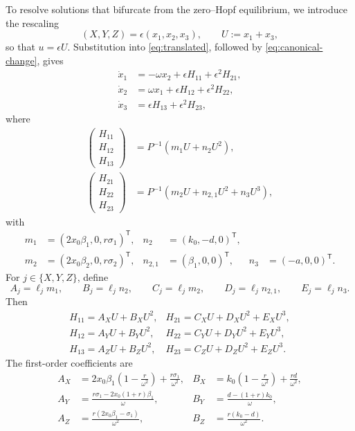\documentclass[11pt]{amsart}
\theoremstyle{remark}
\begin{document}
To resolve solutions that bifurcate from the zero--Hopf equilibrium, we
introduce the rescaling
\[
 (X,Y,Z)=\epsilon(x_1,x_2,x_3),\qquad U:=x_1+x_3,
\]
so that \(u=\epsilon U\).  Substitution into \eqref{eq:translated}, followed
by \eqref{eq:canonical-change}, gives
\begin{equation}\label{eq:blowup}
\begin{aligned}
\dot{x}_1&=-\omega x_2+\epsilon H_{11}+\epsilon^2H_{21},\\
\dot{x}_2&=\omega x_1+\epsilon H_{12}+\epsilon^2H_{22},\\
\dot{x}_3&=\epsilon H_{13}+\epsilon^2H_{23},
\end{aligned}
\end{equation}
where
\begin{equation}\label{eq:H-definitions}
\begin{aligned}
\begin{pmatrix}H_{11}\\H_{12}\\H_{13}\end{pmatrix}
&=P^{-1}(m_1U+n_2U^2),\\
\begin{pmatrix}H_{21}\\H_{22}\\H_{23}\end{pmatrix}
&=P^{-1}(m_2U+n_{2,1}U^2+n_3U^3),
\end{aligned}
\end{equation}
with
\[
\begin{aligned}
m_1&=(2x_0\beta_1,0,r\sigma_1)^{\mathsf T},
& n_2&=(k_0,-d,0)^{\mathsf T},\\
m_2&=(2x_0\beta_2,0,r\sigma_2)^{\mathsf T},
& n_{2,1}&=(\beta_1,0,0)^{\mathsf T},
& n_3&=(-a,0,0)^{\mathsf T}.
\end{aligned}
\]
For \(j\in\{X,Y,Z\}\), define
\[
 A_j=\ell_jm_1,\qquad B_j=\ell_jn_2,\qquad
 C_j=\ell_jm_2,\qquad D_j=\ell_jn_{2,1},\qquad E_j=\ell_jn_3.
\]
Then
\begin{equation}\label{eq:H-coefficients}
\begin{array}{lll}
H_{11}=A_XU+B_XU^2,&
H_{21}=C_XU+D_XU^2+E_XU^3,\\
H_{12}=A_YU+B_YU^2,&
H_{22}=C_YU+D_YU^2+E_YU^3,\\
H_{13}=A_ZU+B_ZU^2,&
H_{23}=C_ZU+D_ZU^2+E_ZU^3.
\end{array}
\end{equation}
The first-order coefficients are
\begin{equation}\label{eq:first-order-coefficients}
\begin{aligned}
A_X&=2x_0\beta_1\left(1-\frac r{\omega^2}\right)
     +\frac{r\sigma_1}{\omega^2},
&
B_X&=k_0\left(1-\frac r{\omega^2}\right)+\frac{rd}{\omega^2},\\
A_Y&=\frac{r\sigma_1-2x_0(1+r)\beta_1}{\omega},
&
B_Y&=\frac{d-(1+r)k_0}{\omega},\\
A_Z&=\frac{r(2x_0\beta_1-\sigma_1)}{\omega^2},
&
B_Z&=\frac{r(k_0-d)}{\omega^2}.
\end{aligned}
\end{equation}
\end{document}
